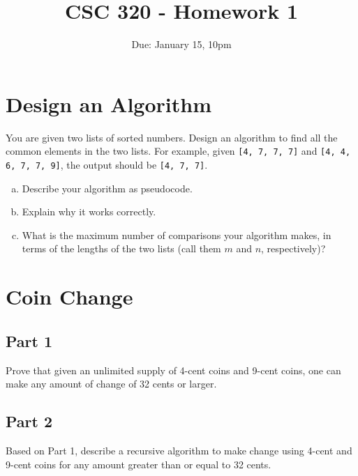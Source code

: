 \documentclass[12pt]{article}
\title{CSC 320 - Homework 1}
\author{}
\date{Due: January 15, 10pm}
\begin{document}
\tableofcontents

\section{Design an Algorithm}

You are given two lists of sorted numbers. Design an algorithm to find all the common elements in the two lists. For example, given \verb+[4, 7, 7, 7]+ and \verb+[4, 4, 6, 7, 7, 9]+, the output should be \verb+[4, 7, 7]+. 

\begin{enumerate}[a.]
    \item Describe your algorithm as pseudocode.
    \item Explain why it works correctly.
    \item What is the maximum number of comparisons your algorithm makes, in terms of the lengths of the two lists (call them $m$ and $n$, respectively)?
\end{enumerate}


\clearpage
\section{Coin Change}

\subsection*{Part 1}
Prove that given an unlimited supply of 4-cent coins and 9-cent coins, one can make any amount of change of 32 cents or larger.

\vspace{4in}

\subsection*{Part 2}
Based on Part 1, describe a recursive algorithm to make change using 4-cent and 9-cent coins for any amount greater than or equal to 32 cents.\\~

    \begin{algorithmic}

        \LComment{%
                  \vspace{1.3in}\\}

        \EndProcedure
    \end{algorithmic}
\end{document}
